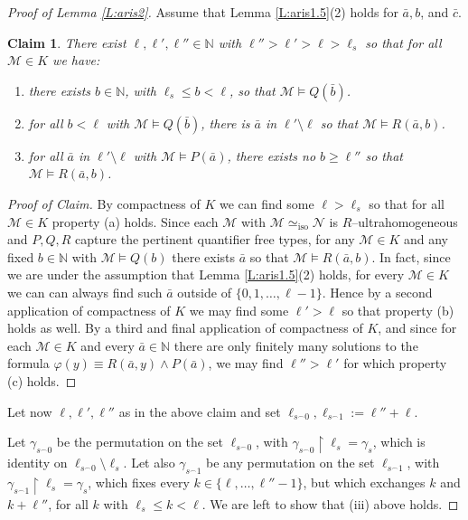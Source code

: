 \documentclass[11pt]{amsart}
\theoremstyle{plain}
\newtheorem{claim}[theorem]{Claim}
\theoremstyle{definition}
\begin{document}
\begin{proof}[Proof of Lemma \ref{L:aris2}]
\bigskip{}

 Assume that Lemma \ref{L:aris1.5}(2) holds for $\bar{a}, b$, and $\bar{c}$. 

\begin{claim}
There exist $\ell,\ell',\ell''\in\mathbb{N}$ with $\ell''>\ell'>\ell>\ell_s$ so that for all $\mathcal{M}\in K$ we have:
\begin{enumerate}
    \item[(a)] there exists $b\in\mathbb{N}$, with $\ell_s \leq b<\ell$, so that $\mathcal{M}\models Q(\bar{b})$.
    \item[(b)] for all $b<\ell$ with  $\mathcal{M}\models Q(\bar{b})$, there is $\bar{a}$ in $\ell'\setminus \ell$ so that $\mathcal{M}\models R(\bar{a},b)$.
   \item[(c)] for all $\bar{a}$ in $\ell'\setminus \ell$ with  $\mathcal{M}\models P(\bar{a})$, there exists no $b\geq \ell''$ so that $\mathcal{M}\models R(\bar{a},b)$. 
\end{enumerate}
\end{claim}
\begin{proof}[Proof of Claim]


By compactness of $K$ we can find some $\ell>\ell_s$ so that for all $\mathcal{M}\in K$ property (a) holds. Since each $\mathcal{M}$ with $\mathcal{M}\simeq_{\mathrm{iso}}\mathcal{N}$ is $R$--ultrahomogeneous and $P,Q,R$ capture the pertinent quantifier free types, for any $\mathcal{M}\in K$ and any fixed  $b\in\mathbb{N}$ with  $\mathcal{M}\models Q(b)$ there exists   $\bar{a}$ so that $\mathcal{M}\models R(\bar{a},b)$. In fact, since we are under the assumption that Lemma \ref{L:aris1.5}(2) holds, for  every $\mathcal{M}\in K$ we can can always find such $\bar{a}$ outside of $\{0,1,\ldots,\ell-1\}$.  Hence by a second application of compactness of $K$  we may find some $\ell'>\ell$ so that property (b) holds as well. 
By a third and final application of compactness
of $K$, and since for each  $\mathcal{M}\in K$ and every $\bar{a}\in\mathbb{N}$ there are only finitely many solutions to the formula $\varphi(y) \equiv R(\bar{a},y)\wedge P(\bar{a})$, we may find  $\ell''>\ell'$ for which  property (c) holds.
\end{proof}

Let now $\ell,\ell',\ell''$ as in the above claim and set $\ell_{s^{\frown}0}, \ell_{s^{\frown}1}:=\ell''+\ell$. 


Let $\gamma_{s^{\frown}0}$ be the permutation on the set $\ell_{s^{\frown}0}$, with  $\gamma_{s^{\frown}0}\upharpoonright \ell_s= \gamma_{s}$, which is identity on $\ell_{s^{\frown}0}\setminus\ell_s$.
Let also $\gamma_{s^{\frown}1}$ be any permutation on the set $\ell_{s^{\frown}1}$, with  $\gamma_{s^{\frown}1}\upharpoonright \ell_s= \gamma_{s}$,  which  fixes every $k\in\{\ell,\ldots,\ell''-1\}$, but which exchanges $k$ and  $k+\ell''$, for all  $k$ with $\ell_s\leq k <\ell$. We are left to show that  (iii) above holds.






\end{proof}
\end{document}
